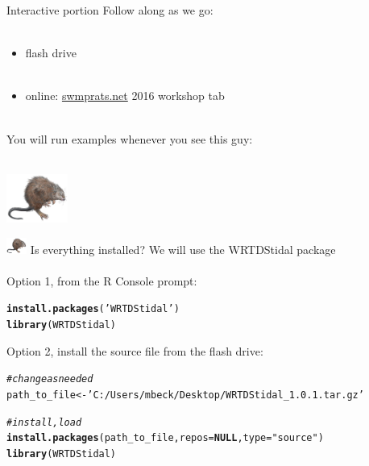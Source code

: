 \documentclass[xcolor=dvipsnames,serif]{beamer}\usepackage[]{graphicx}\usepackage[]{color}
\makeatletter
\newcommand{\hlstr}[1]{\textcolor[rgb]{0.192,0.494,0.8}{#1}}%
\newcommand{\hlcom}[1]{\textcolor[rgb]{0.678,0.584,0.686}{\textit{#1}}}%
\newcommand{\hlstd}[1]{\textcolor[rgb]{0.345,0.345,0.345}{#1}}%
\newcommand{\hlkwa}[1]{\textcolor[rgb]{0.161,0.373,0.58}{\textbf{#1}}}%
\newcommand{\hlkwb}[1]{\textcolor[rgb]{0.69,0.353,0.396}{#1}}%
\newcommand{\hlkwc}[1]{\textcolor[rgb]{0.333,0.667,0.333}{#1}}%
\newcommand{\hlkwd}[1]{\textcolor[rgb]{0.737,0.353,0.396}{\textbf{#1}}}%
\newenvironment{kframe}{%
 \def\at@end@of@kframe{}%
 \ifinner\ifhmode%
  \def\at@end@of@kframe{\end{minipage}}%
  \begin{minipage}{\columnwidth}%
 \fi\fi%
 \def\FrameCommand##1{\hskip\@totalleftmargin \hskip-\fboxsep
 \colorbox{shadecolor}{##1}\hskip-\fboxsep
     \hskip-\linewidth \hskip-\@totalleftmargin \hskip\columnwidth}%
 \MakeFramed {\advance\hsize-\width
   \@totalleftmargin\z@ \linewidth\hsize
   \@setminipage}}%
 {\par\unskip\endMakeFramed%
 \at@end@of@kframe}
\newenvironment{knitrout}{}{} %
\makeatother
\begin{document}
\begin{frame}{Interactive portion}
\onslide<+->
Follow along as we go:\\~\\
\begin{itemize}
\item flash drive\\~\\
\item online: \href{http://swmprats.net/}{swmprats.net} 2016 workshop tab \\~\\
\end{itemize}
\onslide<+->
You will run examples whenever you see this guy: \\~\\
\centerline{\includegraphics[width = 0.15\textwidth]{imgs/swmprat.png}} 
\end{frame}

\begin{frame}[fragile]{\includegraphics[width = 0.05\textwidth]{imgs/swmprat.png} Is everything installed?}
We will use the WRTDStidal package \\~\\
Option 1, from the R Console prompt:
\begin{knitrout}\scriptsize
{}\color{fgcolor}\begin{kframe}
\begin{alltt}
\hlkwd{install.packages}\hlstd{(}\hlstr{'WRTDStidal'}\hlstd{)}
\hlkwd{library}\hlstd{(WRTDStidal)}
\end{alltt}
\end{kframe}
\end{knitrout}
\vspace{0.1in}
Option 2, install the source file from the flash drive:
\begin{knitrout}\scriptsize
{}\color{fgcolor}\begin{kframe}
\begin{alltt}
\hlcom{# change as needed}
\hlstd{path_to_file} \hlkwb{<-} \hlstr{'C:/Users/mbeck/Desktop/WRTDStidal_1.0.1.tar.gz'}

\hlcom{# install, load}
\hlkwd{install.packages}\hlstd{(path_to_file,} \hlkwc{repos} \hlstd{=} \hlkwa{NULL}\hlstd{,} \hlkwc{type}\hlstd{=}\hlstr{"source"}\hlstd{)}
\hlkwd{library}\hlstd{(WRTDStidal)}
\end{alltt}
\end{kframe}
\end{knitrout}
\end{frame}
\end{document}
